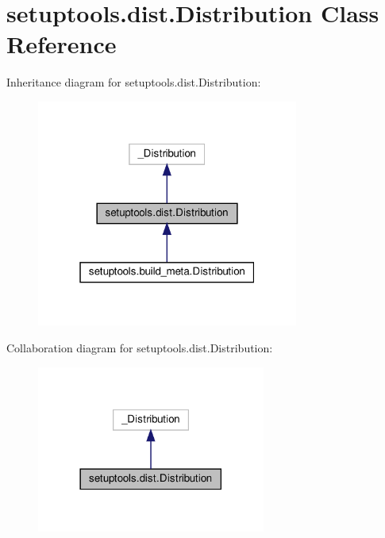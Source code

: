 \hypertarget{classsetuptools_1_1dist_1_1Distribution}{}\section{setuptools.\+dist.\+Distribution Class Reference}
\label{classsetuptools_1_1dist_1_1Distribution}


Inheritance diagram for setuptools.\+dist.\+Distribution\+:
\nopagebreak
\begin{figure}[H]
\begin{center}
\leavevmode
\includegraphics[width=244pt]{classsetuptools_1_1dist_1_1Distribution__inherit__graph}
\end{center}
\end{figure}


Collaboration diagram for setuptools.\+dist.\+Distribution\+:
\nopagebreak
\begin{figure}[H]
\begin{center}
\leavevmode
\includegraphics[width=213pt]{classsetuptools_1_1dist_1_1Distribution__coll__graph}
\end{center}
\end{figure}
